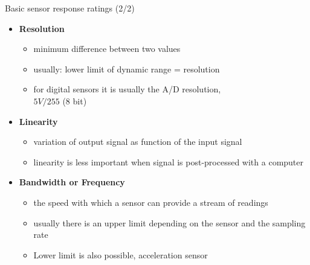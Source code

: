 \documentclass[compress]{beamer}
\begin{document}

\begin{frame}{Basic sensor response ratings (2/2)}

    \begin{itemize}
        \item {\bf Resolution}
              \begin{itemize}
                  \item minimum difference between two values
                  \item usually: lower limit of dynamic range = resolution
                  \item for digital sensors it is usually the A/D resolution,\\ \eg $ 5V / 255 $ (8 bit)

              \end{itemize}

        \item {\bf Linearity}

              \begin{itemize}
                  \item
                        variation of output signal as function of the input signal
                  \item
                        linearity is less important when signal is post-processed with a
                        computer
              \end{itemize}

        \item {\bf Bandwidth or Frequency}

              \begin{itemize}
                  \item the speed with which a sensor can provide a stream of readings
                  \item usually there is an upper limit depending on the sensor and the
                        sampling rate
                  \item Lower limit is also possible, \eg acceleration sensor
              \end{itemize}

    \end{itemize}
\end{frame}
\end{document}

